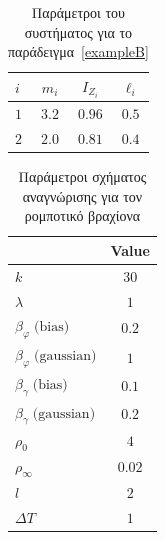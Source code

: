 \begin{table}
	\centering
	\caption{Παράμετροι του συστήματος για το παράδειγμα~\ref{exampleB}}
	\label{tab:2dof_params}
	\begin{tabular}{l | ccc}
		\hline \hline
		$i$ & $m_i$ & $I_{Z_i}$ & $\ell_i$ \\ \hline \hline
		$1$ & $3.2$ & $0.96$ & $0.5$ \\\hline 
		$2$ & $2.0$ & $0.81$ & $0.4$ \\ \hline 
	\end{tabular}
\end{table}


{\begin{table}
		\centering
		\captionsetup{format=plain}
		\caption{Παράμετροι σχήματος αναγνώρισης για τον ρομποτικό βραχίονα}
		\label{tab:2dof_schema_params}
		\begin{tabular}{ l | c }
			\hline\hline
			\text{Parameter} & Value \\ \hline\hline
			$k$             & $30$   \\ \hline
			$\lambda$       & $1 $   \\ \hline
			$\beta_{\varphi} \;\text{(bias)}$     & $0.2$ \\ \hline
			$\beta_{\varphi} \;\text{(gaussian)}$ & $1$ \\ \hline
			$\beta_{\gamma} \;\text{(bias)}$     & $0.1$ \\ \hline
			$\beta_{\gamma} \;\text{(gaussian)}$ & $0.2$ \\ \hline
			$\rho_0      $ & $4$  \\ \hline
			$\rho_\infty $ & $0.02$  \\ \hline
			$l           $ & $2$  \\ \hline
			$\textit{ΔΤ} $  & $1$ 	\\ \hline \hline	
		\end{tabular}
	\end{table}

}
